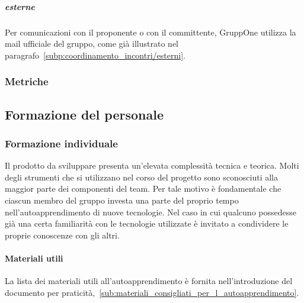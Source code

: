 \documentclass[../norme-di-progetto.tex]{subfiles}
\begin{document}
\subparagraph{esterne}%
\label{subp:esterne}
Per comunicazioni con il proponente o con il committente, GruppOne utilizza la mail ufficiale del gruppo, come già illustrato nel paragrafo~\ref{subp:coordinamento_incontri/esterni}.


\subsubsection{Metriche}%
\label{subs:gestione_del_personale/metriche}


\subsection{Formazione del personale}%
\label{sub:formazione_del_personale}

\subsubsection{Formazione individuale}%
\label{subs:formazione_individuale}

Il prodotto da sviluppare presenta un'elevata complessità tecnica e teorica.
Molti degli strumenti che si utilizzano nel corso del progetto sono sconosciuti alla maggior parte dei componenti del team.
Per tale motivo è fondamentale che ciascun membro del gruppo investa una parte del proprio tempo nell'autoapprendimento di nuove tecnologie.
Nel caso in cui qualcuno possedesse già una certa familiarità con le tecnologie utilizzate è invitato a condividere le proprie conoscenze con gli altri.

\paragraph{Materiali utili}%
\label{par:materiali_utili}

La lista dei materiali utili all'autoapprendimento è fornita nell'introduzione del documento per praticità,~\ref{sub:materiali_consigliati_per_l_autoapprendimento}.

\end{document}
